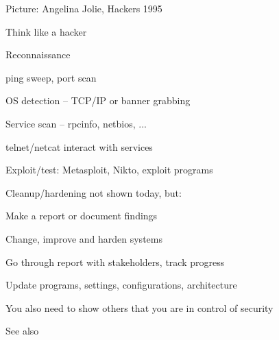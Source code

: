 \documentclass[Screen16to9,17pt]{foils}
\begin{document}
Picture: Angelina Jolie, Hackers 1995





\begin{list1}
\item Think like a hacker
\item Reconnaissance
\begin{list2}
\item ping sweep, port scan
\item OS detection -- TCP/IP or banner grabbing
\item Service scan -- rpcinfo, netbios, ...
\item telnet/netcat interact with services
\end{list2}
\item Exploit/test: Metasploit, Nikto, exploit programs
\item Cleanup/hardening not shown today, but:
\begin{list2}
\item Make a report or document findings
\item Change, improve and harden systems
\item Go through report with stakeholders, track progress
\item Update programs, settings, configurations, architecture
\end{list2}
\item You also need to show others that you are in control of security
\end{list1}





See also 

\end{document}
